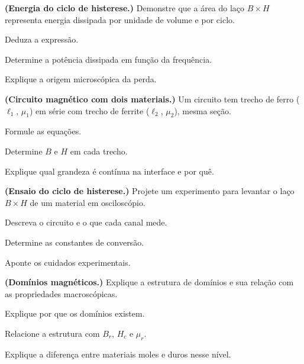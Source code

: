 \blocodesafio
\begin{questao}[4]{}

\textbf{(Energia do ciclo de histerese.)} Demonstre que a área do laço
$B\times H$ representa energia dissipada por unidade de volume e por ciclo.
\begin{itensq}
\item Deduza a expressão.
\item Determine a potência dissipada em função da frequência.
\item Explique a origem microscópica da perda.
\end{itensq}


\end{questao}
\begin{questao}[4]{}

\textbf{(Circuito magnético com dois materiais.)} Um circuito tem trecho de
ferro ($\ell_1$, $\mu_1$) em série com trecho de ferrite ($\ell_2$,
$\mu_2$), mesma seção.
\begin{itensq}
\item Formule as equações.
\item Determine $B$ e $H$ em cada trecho.
\item Explique qual grandeza é contínua na interface e por quê.
\end{itensq}


\end{questao}
\begin{questao}[4]{}

\textbf{(Ensaio do ciclo de histerese.)} Projete um experimento para levantar o
laço $B\times H$ de um material em osciloscópio.
\begin{itensq}
\item Descreva o circuito e o que cada canal mede.
\item Determine as constantes de conversão.
\item Aponte os cuidados experimentais.
\end{itensq}


\end{questao}
\begin{questao}[4]{}

\textbf{(Domínios magnéticos.)} Explique a estrutura de domínios e sua relação
com as propriedades macroscópicas.
\begin{itensq}
\item Explique por que os domínios existem.
\item Relacione a estrutura com $B_r$, $H_c$ e $\mu_r$.
\item Explique a diferença entre materiais moles e duros nesse nível.
\end{itensq}


\end{questao}
